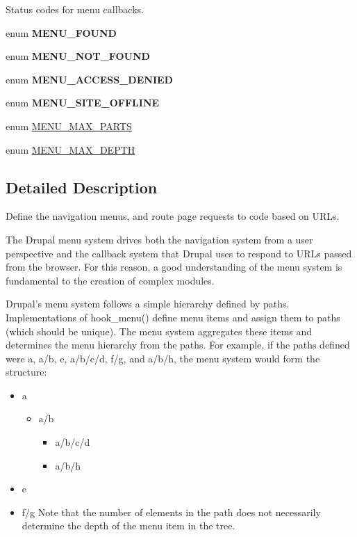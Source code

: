 Status codes for menu callbacks. \begin{CompactItemize}
\item 
enum \textbf{MENU\_\-FOUND} 
\item 
enum \textbf{MENU\_\-NOT\_\-FOUND} 
\item 
enum \textbf{MENU\_\-ACCESS\_\-DENIED} 
\item 
enum \textbf{MENU\_\-SITE\_\-OFFLINE} 
\end{CompactItemize}
\begin{CompactItemize}
\item 
enum \hyperlink{group__menu_g57d50c60b259e886bac766d4ef33abb5}{MENU\_\-MAX\_\-PARTS} 
\item 
enum \hyperlink{group__menu_gae0d9e2610b50124cc0d2b120058c9b8}{MENU\_\-MAX\_\-DEPTH} 
\end{CompactItemize}


\subsection{Detailed Description}
Define the navigation menus, and route page requests to code based on URLs.

The Drupal menu system drives both the navigation system from a user perspective and the callback system that Drupal uses to respond to URLs passed from the browser. For this reason, a good understanding of the menu system is fundamental to the creation of complex modules.

Drupal's menu system follows a simple hierarchy defined by paths. Implementations of hook\_\-menu() define menu items and assign them to paths (which should be unique). The menu system aggregates these items and determines the menu hierarchy from the paths. For example, if the paths defined were a, a/b, e, a/b/c/d, f/g, and a/b/h, the menu system would form the structure:\begin{itemize}
\item a\begin{itemize}
\item a/b\begin{itemize}
\item a/b/c/d\item a/b/h\end{itemize}
\end{itemize}
\item e\item f/g Note that the number of elements in the path does not necessarily determine the depth of the menu item in the tree.\end{itemize}


